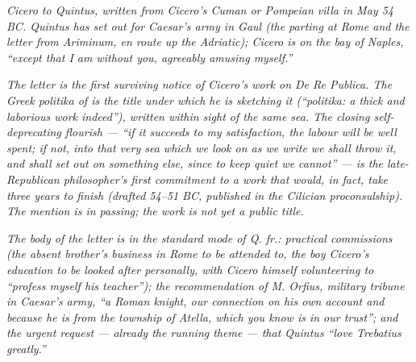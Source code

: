 
\textit{Cicero to Quintus, written from Cicero's Cuman or
Pompeian villa in May 54 BC. Quintus has set out for Caesar's
army in Gaul (the parting at Rome and the letter from
Ariminum, en route up the Adriatic); Cicero is on the bay of
Naples, ``except that I am without you, agreeably amusing
myself.''}

\textit{The letter is the first surviving notice of Cicero's
work on \textit{De Re Publica}. The Greek \textit{politika} of
 is the title under which he is sketching it
(``\textit{politika}: a thick and laborious work indeed''),
written within sight of the same sea. The closing self-deprecating
flourish --- ``if it succeeds to my satisfaction, the labour
will be well spent; if not, into that very sea which we look on
as we write we shall throw it, and shall set out on something
else, since to keep quiet we cannot'' --- is the late-Republican
philosopher's first commitment to a work that would, in fact,
take three years to finish (drafted 54--51 BC, published in the
Cilician proconsulship). The mention is in passing; the work is
not yet a public title.}

\textit{The body of the letter is in the standard mode of
\textit{Q. fr.}: practical commissions (the absent brother's
business in Rome to be attended to, the boy Cicero's education
to be looked after personally, with Cicero himself volunteering
to ``profess myself his teacher''); the recommendation of M.
Orfius, military tribune in Caesar's army, ``a Roman knight,
our connection on his own account and because he is from the
township of Atella, which you know is in our trust''; and the
urgent request --- already the running theme --- that Quintus
``love Trebatius greatly.''}
